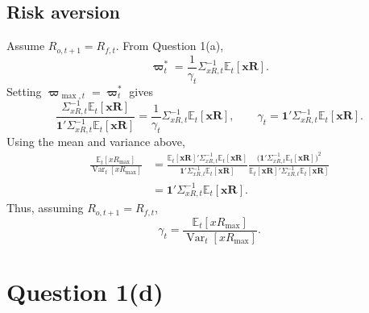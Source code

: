 \documentclass[11pt]{article}
\newcommand{\Et}{\mathbb{E}_t}
\newcommand{\Vt}{\operatorname{Var}_t}
\newcommand{\wt}{\boldsymbol{\varpi}_t}
\begin{document}
\subsection*{Risk aversion}
Assume $R_{o,t+1}=R_{f,t}$. From Question 1(a),
\[
\wt^*=\frac1{\gamma_t}\Sigma_{xR,t}^{-1}\Et[\mathbf{xR}].
\]
Setting $\boldsymbol{\varpi}_{\max,t}=\wt^*$ gives
\[
\frac{\Sigma_{xR,t}^{-1}\Et[\mathbf{xR}]}
{\mathbf1'\Sigma_{xR,t}^{-1}\Et[\mathbf{xR}]}
=\frac1{\gamma_t}\Sigma_{xR,t}^{-1}\Et[\mathbf{xR}],
\qquad
\gamma_t=\mathbf1'\Sigma_{xR,t}^{-1}\Et[\mathbf{xR}].
\]
Using the mean and variance above,
\begin{align*}
\frac{\Et[xR_{\max}]}{\Vt[xR_{\max}]}
&=\frac{\Et[\mathbf{xR}]'\Sigma_{xR,t}^{-1}\Et[\mathbf{xR}]}
{\mathbf1'\Sigma_{xR,t}^{-1}\Et[\mathbf{xR}]}
\frac{\bigl(\mathbf1'\Sigma_{xR,t}^{-1}\Et[\mathbf{xR}]\bigr)^2}
{\Et[\mathbf{xR}]'\Sigma_{xR,t}^{-1}\Et[\mathbf{xR}]}\\
&=\mathbf1'\Sigma_{xR,t}^{-1}\Et[\mathbf{xR}].
\end{align*}
Thus, assuming $R_{o,t+1}=R_{f,t}$,
\[
\boxed{\gamma_t=\frac{\Et[xR_{\max}]}{\Vt[xR_{\max}]}.}
\]

\clearpage
\section*{Question 1(d)}
\end{document}
